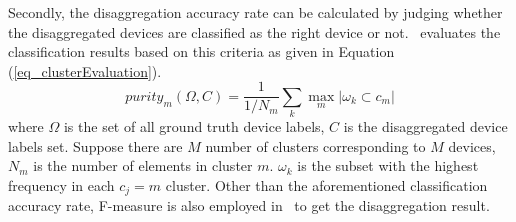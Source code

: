 Secondly, the disaggregation accuracy rate
can be calculated by judging whether
the disaggregated devices are classified as the
right device or not.~\cite{gonccalves2011unsupervised} evaluates the classification results
based on this criteria as given in Equation (\ref{eq_clusterEvaluation}).
\begin{equation}
\label{eq_clusterEvaluation}
purity_m(\Omega, C) = \frac{1}{1/N_m}\sum_k \max_m |\omega_k \subset c_m|
\end{equation}
where $\Omega$ is the set of all ground truth device labels,
$C$ is the disaggregated device labels set.
Suppose there are $M$ number of clusters corresponding to $M$ devices,
$N_m$ is the number of elements in cluster $m$.
$\omega_k$ is the subset with the highest frequency in each $c_j=m$ cluster.
Other than the aforementioned classification accuracy rate, 
F-measure is also employed in~\cite{zeifman2012disaggregation} 
to get the disaggregation result.


%


